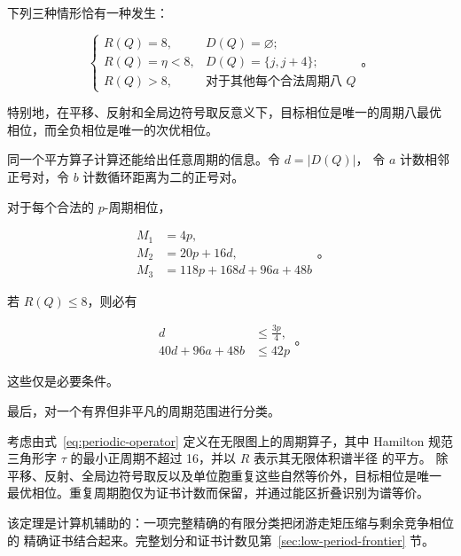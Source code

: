\begin{theorem}[周期八相位三分定理]
\label{thm:eight-barrier-trichotomy}
下列三种情形恰有一种发生：

\begin{equation}
\begin{cases}
R(Q)=8, & D(Q)=\varnothing; \\
R(Q)=\eta<8, & D(Q)=\{j,j+4\}; \\
R(Q)>8, & \text{对于其他每个合法周期八 }Q
\end{cases}
\text{。}
\end{equation}

特别地，在平移、反射和全局边符号取反意义下，目标相位是唯一的周期八最优
相位，而全负相位是唯一的次优相位。

\end{theorem}
同一个平方算子计算还能给出任意周期的信息。令 \(d=\lvert D(Q)\rvert\)，
令 \(a\) 计数相邻正号对，令 \(b\) 计数循环距离为二的正号对。

\begin{theorem}[一般周期必要条件定理]
\label{thm:general-period-moment-obstruction}
对于每个合法的 \(p\)-周期相位，

\begin{equation}
\begin{aligned}
M_{1}&=4p, \\
M_{2}&=20p+16d, \\
M_{3}&=118p+168d+96a+48b
\end{aligned}
\text{。}
\end{equation}

若 \(R(Q)\leq 8\)，则必有

\begin{equation}
\begin{aligned}
d&\leq \frac{3p}{4}, \\
40d+96a+48b&\leq 42p
\end{aligned}
\text{。}
\end{equation}

这些仅是必要条件。

\end{theorem}
最后，对一个有界但非平凡的周期范围进行分类。

\begin{theorem}[低周期谱极值分类定理]
\label{thm:low-period-frontier}
考虑由式~\eqref{eq:periodic-operator} 定义在无限图上的周期算子，其中 Hamilton 规范
三角形字 \(\tau\) 的最小正周期不超过 16，并以 \(R\) 表示其无限体积谱半径
的平方。
除平移、反射、全局边符号取反以及单位胞重复这些自然等价外，目标相位是唯一
最优相位。重复周期胞仅为证书计数而保留，并通过能区折叠识别为谱等价。

\end{theorem}
该定理是计算机辅助的：一项完整精确的有限分类把闭游走矩压缩与剩余竞争相位的
精确证书结合起来。完整划分和证书计数见第~\ref{sec:low-period-frontier} 节。

